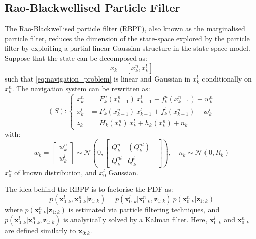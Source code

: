 \subsection{Rao-Blackwellised Particle Filter}

The Rao-Blackwellised particle filter (RBPF), also known as the marginalised particle filter, reduces the dimension of the
state-space explored by the particle filter by exploiting a partial linear-Gaussian structure in the state-space model. Suppose that the state can be decomposed as:
\begin{equation}
	x_k=\left[x_k^n,x_k^l\right]
\end{equation}
such that \eqref{eq:navigation_problem} is linear and Gaussian in $x_k^l$ conditionally on $x_k^n$. The navigation system can be rewritten as:
\begin{equation}
	(S):\left\{\begin{aligned}
	x_k^n&=F_k^n\left(x_{k-1}^n\right)\:x_{k-1}^l+f_k^n\left(x_{k-1}^n\right)+w_k^n\\
	x_k^l&=F_k^l\left(x_{k-1}^n\right)\:x_{k-1}^l+f_k^l\left(x_{k-1}^n\right)+w_k^l\\
	z_k&=H_k\left(x_k^n\right)\:x_k^l+h_k\left(x_k^n\right)+n_k
	\end{aligned}\right.\label{eq:RBPF_model}
\end{equation}
with:
\begin{equation}
	w_k=\begin{bmatrix}w_k^n\\w_k^l\end{bmatrix}
	\sim\mathcal{N}\left(0,\begin{bmatrix}
	Q_k^n&(Q_k^{nl})^\top\\Q_k^{nl}&Q_k^l
	\end{bmatrix}\right),\quad n_k\sim\mathcal{N}(0,R_k)
\end{equation}
$x_0^n$ of known distribution, and $x_0^l$ Gaussian.

The idea behind the RBPF is to factorise the PDF as:
\begin{equation}
	p\left(\mathbf{x}_{0:k}^l,\mathbf{x}_{0:k}^n|\mathbf{z}_{1:k}\right)=p\left(\mathbf{x}_{0:k}^l|\mathbf{x}_{0:k}^n,\mathbf{z}_{1:k}\right)\:p\left(\mathbf{x}_{0:k}^n|\mathbf{z}_{1:k}\right)
\end{equation}
where $p(\mathbf{x}_{0:k}^n|\mathbf{z}_{1:k})$ is estimated via particle filtering techniques, and $p(\mathbf{x}_{0:k}^l|\mathbf{x}_{0:k}^n,\mathbf{z}_{1:k})$ is analytically solved by a Kalman filter. Here, $\mathbf{x}_{0:k}^l$ and $\mathbf{x}_{0:k}^n$ are defined similarly to $\mathbf{x}_{0:k}$.

